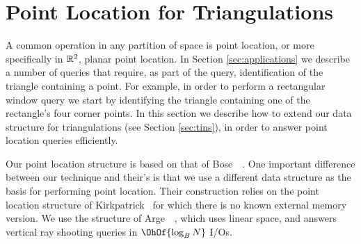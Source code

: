 
%
%
%
%
%
%

\section{Point Location for Triangulations}\label{sec:point_location}


A common operation in any partition of space is point location, or more
specifically in $\mathbb{R}^2$, planar point location.
In Section \ref{sec:applications} we describe a number of queries
that require, as part of the query, identification of the triangle 
containing a point. 
For example, in order to perform a rectangular window query we start by
identifying the triangle containing one of the rectangle's four
corner points.
In this section we describe how to extend our data structure
for triangulations (see Section \ref{sec:tins}), in order to answer point 
location queries efficiently.

Our point location structure is based on that of 
Bose~\etal~\cite{DBLP:journals/talg/BoseCHMM12}.
One important difference between our technique and their's is that we use
a different data structure as the basis for performing point location.
Their construction relies on the point location structure of 
Kirkpatrick~\cite{DBLP:journals/siamcomp/Kirkpatrick83} for which there is no
known external memory version.  
We use the structure of Arge~\etal~\cite{DBLP:conf/alenex/ArgeDT03},
which uses linear space, and answers vertical ray shooting queries in 
$\OhOf{\log_B N}$ I/Os.

